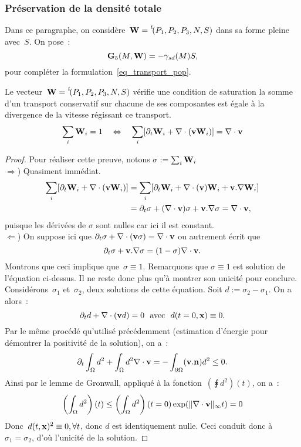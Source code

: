 \documentclass[main.tex]{subfiles}
\begin{document}
\subsubsection{Préservation de la densité totale}
Dans ce paragraphe, on considère~${\bf W}=\prescript{\mathit{t\!}}{}{(P_1, P_2, P_3, N, S)}$ dans sa forme pleine \ie avec~$S$. On pose~:
\begin{equation}\label{eq:G5}
{\bf G}_5(M,{\bf W}) = -\gamma_{sd}(M) S,
\end{equation}
pour compléter la formulation~\eqref{eq_transport_pop}.
\begin{prop}
Le vecteur~${\bf W}=\prescript{\mathit{t\!}}{}{(P_1, P_2, P_3, N, S)}$ vérifie une condition de saturation \ssi la somme d'un transport conservatif sur chacune de ses composantes est égale à la divergence de la vitesse régissant ce transport.
\begin{equation}
\sum_i {\bf W}_i = 1 \quad \Leftrightarrow \quad \sum_i  [ \partial_t {\bf W}_i + \nabla\cdot(\mathbf{v}{\bf W}_i) ] = \nabla\cdot \mathbf{v}
\end{equation}
\end{prop}
\begin{proof}
Pour réaliser cette preuve, notons $\sigma := \sum_i {\bf W}_i$ \\
$\Rightarrow$) Quasiment immédiat.
\begin{align*}
\sum_i  [ \partial_t {\bf W}_i + \nabla\cdot(\mathbf{v}{\bf W}_i) ] & = \sum_i  [ \partial_t {\bf W}_i + \nabla\cdot(\mathbf{v}) {\bf W}_i + \mathbf{v} . \nabla {\bf W}_i ] \\
& = \partial_t \sigma + (\nabla\cdot\mathbf{v}) \sigma + \mathbf{v} . \nabla \sigma = \nabla\cdot \mathbf{v},
\end{align*}
puisque les dérivées de $\sigma$  sont nulles car ici il est constant. \\
$\Leftarrow$) On suppose ici que $\partial_t \sigma + \nabla\cdot (\mathbf{v} \sigma ) = \nabla\cdot \mathbf{v}$ ou autrement écrit que $$ \partial_t \sigma + \mathbf{v} . \nabla \sigma  = (1-\sigma) \nabla\cdot \mathbf{v}.$$ Montrons que ceci implique que~$\sigma\equiv1$. Remarquons que $\sigma\equiv1$ est solution de l'équation ci-dessus. Il ne reste donc plus qu'à montrer son unicité pour conclure. Considérons~$\sigma_1$ et~$\sigma_2$, deux solutions de cette équation. Soit $d:=\sigma_2-\sigma_1$. On a alors~:
$$ \partial_t d + \nabla\cdot (\mathbf{v} d) = 0 \textrm{~~avec~~} d(t=0,\mathbf{x})\equiv0. $$
Par le même procédé qu'utilisé précédemment (estimation d'énergie pour démontrer la positivité de la solution), on a~:
\begin{equation}
\partial_t \int_\Omega d^2 + \int_\Omega d^2 \nabla\cdot \mathbf{v} = - \int_{\partial \Omega} (\mathbf{v} . {\bf n}) d^2 \leq 0.
\end{equation}
Ainsi par le lemme de Gronwall, appliqué à la fonction~$\left(\intx d^2 \right)(t)$, on a~:
\begin{equation}
\left(\int_\Omega d^2 \right)(t) \leq \left(\int_\Omega d^2 \right)(t=0) \exp ( \| \nabla\cdot \mathbf{v} \|_{\infty} t ) = 0
\end{equation}
Donc~$d(t,\mathbf{x})^2\equiv0, \forall t$, donc $d$ est identiquement nulle. Ceci conduit donc à~$\sigma_1=\sigma_2$, d'où l'unicité de la solution. 
\end{proof}
\end{document}
